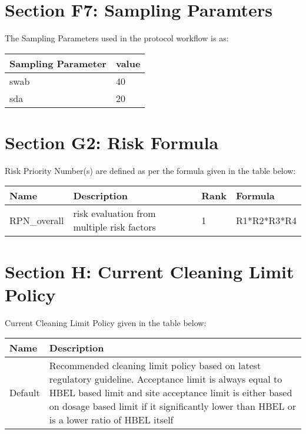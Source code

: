 \documentclass{article}
\begin{document}
        
                \newpage
                \section{Section F7: Sampling Paramters}         
                The Sampling Parameters used in the protocol workflow is as:
                \begin{longtable}[l]{ |p{3.6cm} |p{1cm} |}
                \hline

                Sampling Parameter & value\\

                \hline

    swab & 40\\
\hline
sda & 20\\
\hline

    \end{longtable}
    
        
                \newpage
                \section{Section G2: Risk Formula}         
                Risk Priority Number(s) are defined as per the formula given in the table below:
                \begin{longtable}[l]{ |p{2cm} |p{8cm} |p{1.2cm} |p{3cm} |}
                \hline

                Name & Description & Rank & Formula\\

                \hline

    RPN\_overall & risk evaluation from multiple risk factors & 1 & R1*R2*R3*R4\\
\hline

    \end{longtable}
    
        
                \newpage
                \section{Section H: Current Cleaning Limit Policy}         
                Current Cleaning Limit Policy given in the table below:
                \begin{longtable}[l]{ |p{3.5cm} |p{14cm} |}
                \hline

                Name & Description\\

                \hline

    Default & Recommended cleaning limit policy based on latest regulatory   guideline. Acceptance limit is always equal to HBEL based limit and site acceptance limit is either based   on dosage based limit if it significantly lower than HBEL or is a lower ratio of HBEL itself\\
\hline

    \end{longtable}
    
        
\end{document}
